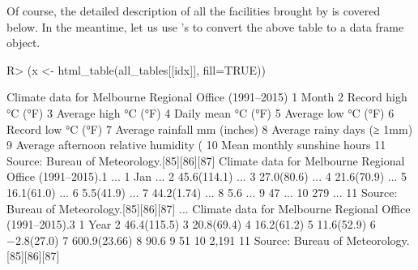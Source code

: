 \documentclass[nojss]{jss}\usepackage[]{graphicx}\usepackage[]{color}
\begin{document}
Of course, the detailed description of all the facilities
brought by  is covered below.
In the meantime, let us use 's 
to convert the above table to a data frame object.


\begin{Schunk}
\begin{Sinput}
R> (x <- html_table(all_tables[[idx]], fill=TRUE))
\end{Sinput}
\end{Schunk}

\begin{Schunk}
\begin{Soutput}
   Climate data for Melbourne Regional Office (1991–2015)
1                                                   Month
2                                     Record high °C (°F)
3                                    Average high °C (°F)
4                                      Daily mean °C (°F)
5                                     Average low °C (°F)
6                                      Record low °C (°F)
7                            Average rainfall mm (inches)
8                              Average rainy days (≥ 1mm)
9                 Average afternoon relative humidity (%)
10                            Mean monthly sunshine hours
11             Source: Bureau of Meteorology.[85][86][87]
   Climate data for Melbourne Regional Office (1991–2015).1 ...
1                                                       Jan ...
2                                               45.6(114.1) ...
3                                                27.0(80.6) ...
4                                                21.6(70.9) ...
5                                                16.1(61.0) ...
6                                                 5.5(41.9) ...
7                                                44.2(1.74) ...
8                                                       5.6 ...
9                                                        47 ...
10                                                      279 ...
11               Source: Bureau of Meteorology.[85][86][87] ...
   Climate data for Melbourne Regional Office (1991–2015).3
1                                                      Year
2                                               46.4(115.5)
3                                                20.8(69.4)
4                                                16.2(61.2)
5                                                11.6(52.9)
6                                                −2.8(27.0)
7                                              600.9(23.66)
8                                                      90.6
9                                                        51
10                                                    2,191
11               Source: Bureau of Meteorology.[85][86][87]
\end{Soutput}
\end{Schunk}
\end{document}
